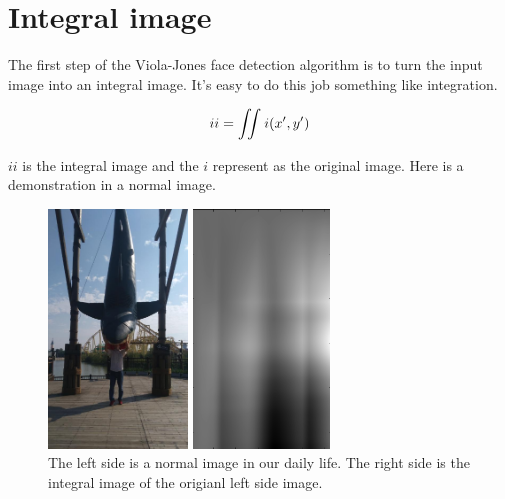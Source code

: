 \documentclass[a4paper, 11pt]{article} %
\begin{document}
\clearpage


\section{Integral image}
The first step of the Viola-Jones \cite{RobustRealTimeFaceDetection, RobustRealTimeObjectDetection} face detection algorithm is to turn the input image into an integral image. It's easy to do this job something like integration.

\begin{equation}
    \centering
    ii = \iint_{}^{} i(x', y')
    \label{equ:integralImage}
\end{equation}



 $ii$ is the integral image and the $i$ represent as the original image. Here is a demonstration in a normal image.

     \begin{figure}[H]
        \centering
        \begin{minipage}[H]{0.3\linewidth}
        \centering
        \includegraphics[height=2.5in, width=\linewidth]{../figure/bigshark.png}
        \end{minipage}
        \begin{minipage}[H]{0.3\linewidth}
        \centering
        \includegraphics[height=2.5in, width=\linewidth]{../figure/integralImageOfBigShark.png}
        \end{minipage}
        \label{fig:normalImage}
        \caption{ The left side is a normal image in our daily life. The right side is the integral image of the origianl left side image.}
    \end{figure}
\end{document}
